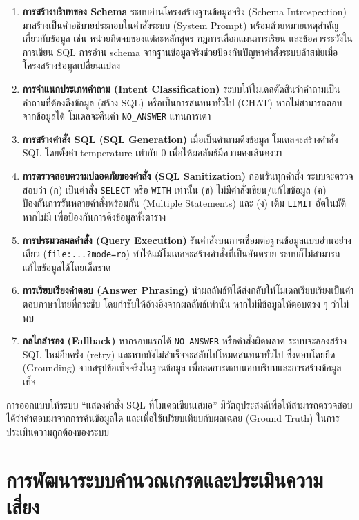 \begin{enumerate}
    \item \textbf{การสร้างบริบทของ Schema} ระบบอ่านโครงสร้างฐานข้อมูลจริง (Schema Introspection) มาสร้างเป็นคำอธิบายประกอบในคำสั่งระบบ (System Prompt) พร้อมด้วยหมายเหตุสำคัญเกี่ยวกับข้อมูล เช่น หน่วยกิตจบของแต่ละหลักสูตร กฎการเลือกแผนการเรียน และข้อควรระวังในการเขียน SQL การอ่าน schema จากฐานข้อมูลจริงช่วยป้องกันปัญหาคำสั่งระบบล้าสมัยเมื่อโครงสร้างข้อมูลเปลี่ยนแปลง
    \item \textbf{การจำแนกประเภทคำถาม (Intent Classification)} ระบบให้โมเดลตัดสินว่าคำถามเป็นคำถามที่ต้องดึงข้อมูล (สร้าง SQL) หรือเป็นการสนทนาทั่วไป (CHAT) หากไม่สามารถตอบจากข้อมูลได้ โมเดลจะคืนค่า \texttt{NO\_ANSWER} แทนการเดา
    \item \textbf{การสร้างคำสั่ง SQL (SQL Generation)} เมื่อเป็นคำถามดึงข้อมูล โมเดลจะสร้างคำสั่ง SQL โดยตั้งค่า temperature เท่ากับ 0 เพื่อให้ผลลัพธ์มีความคงเส้นคงวา
    \item \textbf{การตรวจสอบความปลอดภัยของคำสั่ง (SQL Sanitization)} ก่อนรันทุกคำสั่ง ระบบจะตรวจสอบว่า (ก) เป็นคำสั่ง \texttt{SELECT} หรือ \texttt{WITH} เท่านั้น (ข) ไม่มีคำสั่งเขียน/แก้ไขข้อมูล (ค) ป้องกันการรันหลายคำสั่งพร้อมกัน (Multiple Statements) และ (ง) เติม \texttt{LIMIT} อัตโนมัติหากไม่มี เพื่อป้องกันการดึงข้อมูลทั้งตาราง
    \item \textbf{การประมวลผลคำสั่ง (Query Execution)} รันคำสั่งบนการเชื่อมต่อฐานข้อมูลแบบอ่านอย่างเดียว (\texttt{file:...?mode=ro}) ทำให้แม้โมเดลจะสร้างคำสั่งที่เป็นอันตราย ระบบก็ไม่สามารถแก้ไขข้อมูลได้โดยเด็ดขาด
    \item \textbf{การเรียบเรียงคำตอบ (Answer Phrasing)} นำผลลัพธ์ที่ได้ส่งกลับให้โมเดลเรียบเรียงเป็นคำตอบภาษาไทยที่กระชับ โดยกำชับให้อ้างอิงจากผลลัพธ์เท่านั้น หากไม่มีข้อมูลให้ตอบตรง ๆ ว่าไม่พบ
    \item \textbf{กลไกสำรอง (Fallback)} หากรอบแรกได้ \texttt{NO\_ANSWER} หรือคำสั่งผิดพลาด ระบบจะลองสร้าง SQL ใหม่อีกครั้ง (retry) และหากยังไม่สำเร็จจะสลับไปโหมดสนทนาทั่วไป ซึ่งตอบโดยยึด (Grounding) จากสรุปข้อเท็จจริงในฐานข้อมูล เพื่อลดการตอบนอกบริบทและการสร้างข้อมูลเท็จ
\end{enumerate}

การออกแบบให้ระบบ ``แสดงคำสั่ง SQL ที่โมเดลเขียนเสมอ'' มีวัตถุประสงค์เพื่อให้สามารถตรวจสอบได้ว่าคำตอบมาจากการค้นข้อมูลใด และเพื่อใช้เปรียบเทียบกับผลเฉลย (Ground Truth) ในการประเมินความถูกต้องของระบบ

\section{การพัฒนาระบบคำนวณเกรดและประเมินความเสี่ยง}

